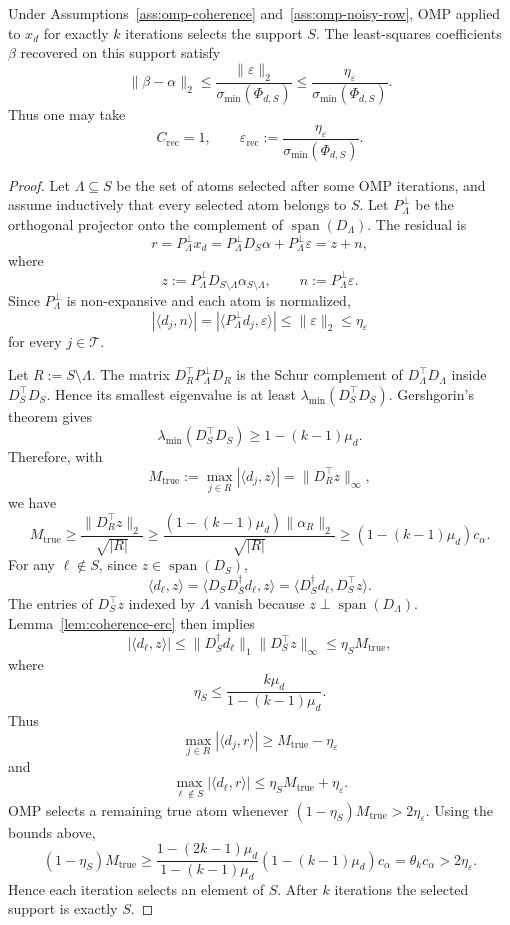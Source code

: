 \begin{theorem}
\label{thm:omp-coefficient-recovery}
Under Assumptions~\ref{ass:omp-coherence} and~\ref{ass:omp-noisy-row}, OMP applied to $x_d$ for exactly $k$ iterations selects the support $S$. The least-squares coefficients $\beta$ recovered on this support satisfy
\[
\|\beta-\alpha\|_2
\le
\frac{\|\varepsilon\|_2}{\sigma_{\min}(\Phi_{d,S})}
\le
\frac{\eta_\varepsilon}{\sigma_{\min}(\Phi_{d,S})}.
\]
Thus one may take
\[
C_{\mathrm{rec}}=1,
\qquad
\varepsilon_{\mathrm{rec}}
:=
\frac{\eta_\varepsilon}{\sigma_{\min}(\Phi_{d,S})}.
\]
\end{theorem}

\begin{proof}
Let $\Lambda\subseteq S$ be the set of atoms selected after some OMP iterations, and assume inductively that every selected atom belongs to $S$. Let $P_\Lambda^\perp$ be the orthogonal projector onto the complement of $\operatorname{span}(D_\Lambda)$. The residual is
\[
r=P_\Lambda^\perp x_d
=
P_\Lambda^\perp D_S\alpha+P_\Lambda^\perp\varepsilon
=
z+n,
\]
where
\[
z:=P_\Lambda^\perp D_{S\setminus\Lambda}\alpha_{S\setminus\Lambda},
\qquad
n:=P_\Lambda^\perp\varepsilon.
\]
Since $P_\Lambda^\perp$ is non-expansive and each atom is normalized,
\[
|\langle d_j,n\rangle|
=
|\langle P_\Lambda^\perp d_j,\varepsilon\rangle|
\le
\|\varepsilon\|_2
\le
\eta_\varepsilon
\]
for every $j\in\mathcal{T}$.

Let $R:=S\setminus\Lambda$. The matrix $D_R^\top P_\Lambda^\perp D_R$ is the Schur complement of $D_\Lambda^\top D_\Lambda$ inside $D_S^\top D_S$. Hence its smallest eigenvalue is at least $\lambda_{\min}(D_S^\top D_S)$. Gershgorin's theorem gives
\[
\lambda_{\min}(D_S^\top D_S)
\ge
1-(k-1)\mu_d.
\]
Therefore, with
\[
M_{\mathrm{true}}:=\max_{j\in R}|\langle d_j,z\rangle|=\|D_R^\top z\|_\infty,
\]
we have
\[
M_{\mathrm{true}}
\ge
\frac{\|D_R^\top z\|_2}{\sqrt{|R|}}
\ge
\frac{(1-(k-1)\mu_d)\|\alpha_R\|_2}{\sqrt{|R|}}
\ge
(1-(k-1)\mu_d)c_\alpha.
\]
For any $\ell\notin S$, since $z\in\operatorname{span}(D_S)$,
\[
\langle d_\ell,z\rangle
=
\langle D_SD_S^\dagger d_\ell,z\rangle
=
\langle D_S^\dagger d_\ell,D_S^\top z\rangle.
\]
The entries of $D_S^\top z$ indexed by $\Lambda$ vanish because $z\perp\operatorname{span}(D_\Lambda)$. Lemma~\ref{lem:coherence-erc} then implies
\[
|\langle d_\ell,z\rangle|
\le
\|D_S^\dagger d_\ell\|_1\|D_S^\top z\|_\infty
\le
\eta_S M_{\mathrm{true}},
\]
where
\[
\eta_S \le \frac{k\mu_d}{1-(k-1)\mu_d}.
\]
Thus
\[
\max_{j\in R}|\langle d_j,r\rangle|
\ge
M_{\mathrm{true}}-\eta_\varepsilon
\]
and
\[
\max_{\ell\notin S}|\langle d_\ell,r\rangle|
\le
\eta_S M_{\mathrm{true}}+\eta_\varepsilon.
\]
OMP selects a remaining true atom whenever $(1-\eta_S)M_{\mathrm{true}}>2\eta_\varepsilon$. Using the bounds above,
\[
(1-\eta_S)M_{\mathrm{true}}
\ge
\frac{1-(2k-1)\mu_d}{1-(k-1)\mu_d}(1-(k-1)\mu_d)c_\alpha
=
\theta_k c_\alpha
>
2\eta_\varepsilon.
\]
Hence each iteration selects an element of $S$. After $k$ iterations the selected support is exactly $S$.


\end{proof}
